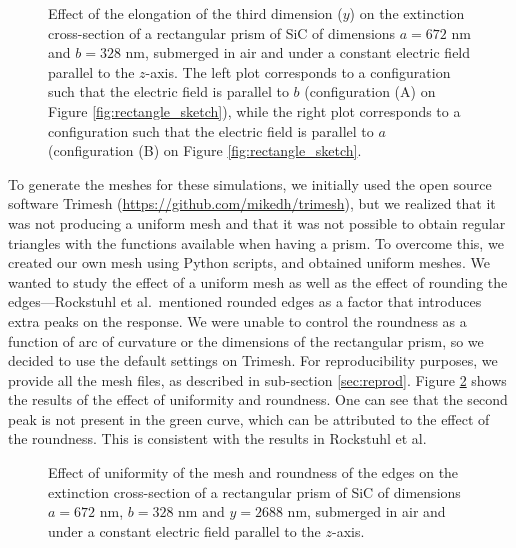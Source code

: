 \begin{figure}
    \centering
    \caption{Effect of the elongation of the third dimension ($y$) on the 
        extinction cross-section of a rectangular prism of SiC of dimensions $a=672$ nm 
        and $b=328$ nm, submerged in air and under a constant electric field 
        parallel to the $z$-axis. The left plot corresponds to a configuration such that the electric 
        field is parallel to $b$ (configuration (A) on Figure \ref{fig:rectangle_sketch}), while the 
        right plot corresponds to a configuration such that the electric field is 
        parallel to $a$ (configuration (B) on Figure \ref{fig:rectangle_sketch}.}
    \label{fig:ext_y_14}   
 \end{figure}


To generate the meshes for these simulations, we initially used the open source software Trimesh 
(\url{https://github.com/mikedh/trimesh}), but we realized that it was not producing a 
uniform mesh and that it was not possible to obtain regular triangles with the functions 
available when having a prism. To overcome this, we created our own mesh using Python scripts,
and obtained uniform meshes. We wanted to study the effect of a uniform mesh as well as the effect
of rounding the edges---Rockstuhl et al.\ mentioned rounded edges
as a factor that introduces extra peaks on the response. We were unable to control the 
roundness as a function of arc of curvature or the dimensions of the rectangular prism, so we 
decided to use the default settings on Trimesh. 
For reproducibility purposes, we provide all the mesh files, as described in sub-section \ref{sec:reprod}.
Figure \ref{fig:tri_reg_round_14} shows the 
results of the effect of uniformity and roundness. One can see that the second peak is not
present in the green curve, which can be attributed to the effect of the roundness. This is 
consistent with the results in Rockstuhl et al. 

\begin{figure}
    \centering
    \caption{Effect of uniformity of the mesh and roundness of the edges on the 
    extinction cross-section of a rectangular prism of SiC of dimensions $a=672$ nm, 
    $b=328$ nm and $y=2688$ nm, submerged in air and under a constant electric field 
    parallel to the $z$-axis.}
    \label{fig:tri_reg_round_14}
 \end{figure}

